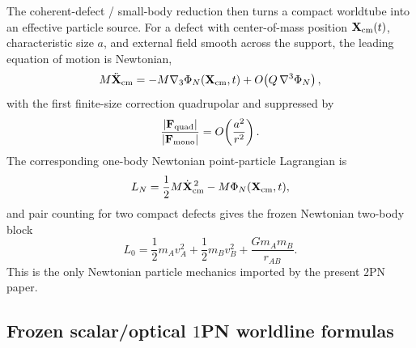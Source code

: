 \documentclass[11pt]{article}
\newcommand{\TwoPN}{\mathrm{2PN}}
\begin{document}
The coherent-defect / small-body reduction then turns a compact worldtube into an
effective particle source.  For a defect with center-of-mass position
\(\mathbf X_{\rm cm}(t)\), characteristic size \(a\), and external field smooth across the
support, the leading equation of motion is Newtonian,
\begin{equation}
M\ddot{\mathbf X}_{\rm cm}
=
-M\nabla_3\Phi_N(\mathbf X_{\rm cm},t)
+O\!\left(Q\,\nabla^3\Phi_N\right),
\label{eq:app-cf-worldtube-force}
\end{equation}
with the first finite-size correction quadrupolar and suppressed by
\begin{equation}
\frac{|\mathbf F_{\rm quad}|}{|\mathbf F_{\rm mono}|}
=O\!\left(\frac{a^2}{r^2}\right).
\label{eq:app-cf-worldtube-quadrupole-suppression}
\end{equation}
The corresponding one-body Newtonian point-particle Lagrangian is
\begin{equation}
L_N
=
\frac12 M\dot{\mathbf X}_{\rm cm}^{\,2}-M\Phi_N(\mathbf X_{\rm cm},t),
\label{eq:app-cf-LN-one-body}
\end{equation}
and pair counting for two compact defects gives the frozen Newtonian two-body block
\begin{equation}
L_0
=
\frac12 m_Av_A^2+\frac12 m_Bv_B^2+\frac{Gm_A m_B}{r_{AB}}.
\label{eq:app-cf-L0-two-body}
\end{equation}
This is the only Newtonian particle mechanics imported by the present \(\TwoPN\) paper.

\subsection{Frozen scalar/optical \texorpdfstring{$1$}{1}PN worldline formulas}
\label{app:carry-forward-scalar-optical}
\end{document}
